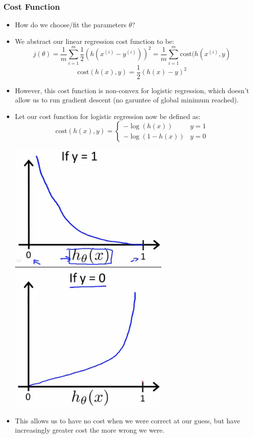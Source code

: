 \subsubsection{Cost Function}
\begin{itemize}[--]
	\item How do we choose/fit the parameters $\theta$?
	\item We abstract our linear regression cost function to be:
		$$j(\theta)=\frac{1}{m}\sum_{i=1}^{m}\frac{1}{2}(h(x^{(i)}-y^{(i)}))^2=\frac{1}{m}\sum_{i=1}^m\text{cost}(h(x^{(i)}, y)$$
		$$\text{cost}(h(x), y)=\frac{1}{2} (h(x)-y)^2$$

	\item However, this cost function is non-convex for logistic regression, which doesn't allow us to run gradient descent (no garuntee of global minimum reached).
	\item Let our cost function for logistic regression now be defined as:
	$$\text{cost}(h(x), y)=\begin{cases}
		-\log (h(x)) & y=1 \\
		-\log (1-h(x)) & y=0
	\end{cases}$$
	\begin{center}
		\includegraphics[scale=0.7,]{sections/cs229/w3/logisticcost.png}
		\newline
		\includegraphics[scale=0.]{sections/cs229/w3/logisticcost0.png}
	\end{center}

	\item This allows us to have no cost when we were correct at our guess, but have increasingly greater cost the more wrong we were.
\end{itemize}

